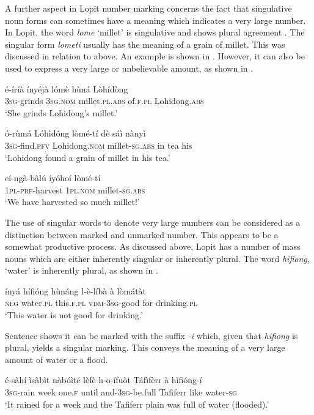 \documentclass[output=paper]{langsci/langscibook}
\begin{document}
A further aspect in Lopit number marking concerns the fact that singulative noun forms can sometimes have a meaning which indicates a very large number. In Lopit, the word \textit{lome} ‘millet’ is singulative and shows plural agreement . The singular form \textit{lometi} usually has the meaning of a grain of millet. This was discussed in relation to  above. An example is shown in . However, it can also be used to express a very large or unbelievable amount, as shown in .

\ea\label{ex:moodie:8}
\gll é-íríà ínyéjà lómè hùná Lòhídòng \\
3\textsc{sg}-grinds 3\textsc{sg.nom} millet.\textsc{pl.abs} of.\textsc{f.pl} Lohidong.\textsc{abs} \\
\glt ‘She grinds Lohidong’s millet.’
\z

\ea\label{ex:moodie:9}
\gll ó-rùmá Lóhìdóng lòmé-tí dè sáì nànyì  \\
3\textsc{sg}-find.\textsc{pfv} Lohidong.\textsc{nom} millet-\textsc{sg.abs} in tea his \\
\glt ‘Lohidong found a grain of millet in his tea.’
\z

\ea\label{ex:moodie:10}
\gll eí-ngà-bàlú íyóhoí lòmé-tí \\
1\textsc{pl-prf}-harvest 1\textsc{pl.nom} millet-\textsc{sg.abs} \\
\glt ‘We have harvested so much millet!’
\z

The use of singular words to denote very large numbers can be considered as a distinction between marked and unmarked number. This appears to be a somewhat productive process. As discussed above, Lopit has a number of mass nouns which are either inherently singular or inherently plural. The word \textit{hifiong}, ‘water’ is inherently plural, as shown in .

\ea\label{ex:moodie:11}
\gll ínyá hífióng hùnáng l-è-líbà à lòmátàt \\
\textsc{neg} water.\textsc{pl} this.\textsc{f.pl} \textsc{vdm-3sg}-good for drinking.\textsc{pl} \\
\glt ‘This water is not good for drinking.’
\z

Sentence  shows it can be marked with the suffix \textit{-i} which, given that \textit{hifiong} is plural, yields a singular marking. This conveys the meaning of a very large amount of water or a flood.

\ea\label{ex:moodie:12}
\gll é-sàhí ìsàbìt nàbóìté lèfè h-o-ífuòt Táfìfèrr à hìfióng-í \\
\textsc{3sg}-rain week one.\textsc{f} until and-3\textsc{sg}-be.full Tafiferr like water-\textsc{sg} \\
\glt ‘It rained for a week and the Tafiferr plain was full of water (flooded).’ 
\z
\end{document}

